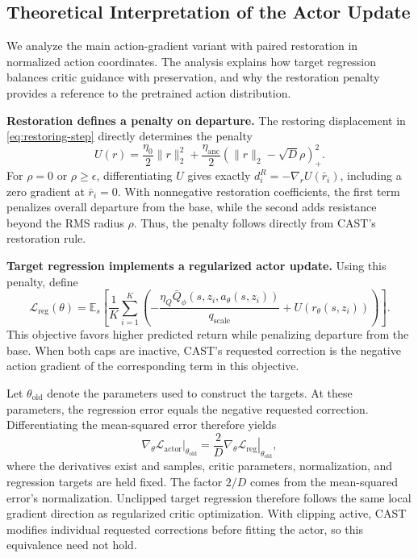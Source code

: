\subsection{Theoretical Interpretation of the Actor Update}

We analyze the main action-gradient variant with paired restoration in normalized action coordinates. The analysis explains how target regression balances critic guidance with preservation, and why the restoration penalty provides a reference to the pretrained action distribution.

\textbf{Restoration defines a penalty on departure.}
The restoring displacement in \eqref{eq:restoring-step} directly determines the penalty
\begin{equation}
U(r)=\frac{\eta_0}{2}\|r\|_2^2+
\frac{\eta_{\mathrm{anc}}}{2}
\left(\|r\|_2-\sqrt{D}\rho\right)_+^2.
\label{eq:radial-potential}
\end{equation}
For $\rho=0$ or $\rho\geq\epsilon$, differentiating $U$ gives exactly $d_i^R=-\nabla_rU(\bar r_i)$, including a zero gradient at $\bar r_i=0$. With nonnegative restoration coefficients, the first term penalizes overall departure from the base, while the second adds resistance beyond the RMS radius $\rho$. Thus, the penalty follows directly from CAST's restoration rule.

\textbf{Target regression implements a regularized actor update.}
Using this penalty, define
\begin{equation}
\mathcal L_{\mathrm{reg}}(\theta)
=\mathbb E_s\!\left[
\frac{1}{K}\sum_{i=1}^{K}
\left(
-\frac{\eta_Q\bar Q_\phi(s,z_i,a_\theta(s,z_i))}
{q_{\mathrm{scale}}}
+U(r_\theta(s,z_i))
\right)
\right].
\end{equation}
This objective favors higher predicted return while penalizing departure from the base. When both caps are inactive, CAST's requested correction is the negative action gradient of the corresponding term in this objective.

Let $\theta_{\mathrm{old}}$ denote the parameters used to construct the targets. At these parameters, the regression error equals the negative requested correction. Differentiating the mean-squared error therefore yields
\begin{equation}
\left.\nabla_\theta\mathcal L_{\mathrm{actor}}\right|_{\theta_{\mathrm{old}}}
=
\frac{2}{D}
\left.\nabla_\theta\mathcal L_{\mathrm{reg}}\right|_{\theta_{\mathrm{old}}},
\label{eq:local-gradient}
\end{equation}
where the derivatives exist and samples, critic parameters, normalization, and regression targets are held fixed. The factor $2/D$ comes from the mean-squared error's normalization. Unclipped target regression therefore follows the same local gradient direction as regularized critic optimization. With clipping active, CAST modifies individual requested corrections before fitting the actor, so this equivalence need not hold.

